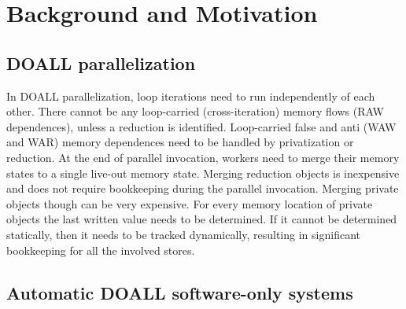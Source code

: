 \section{Background and Motivation}
\label{sec:motivation}

\subsection{DOALL parallelization}

In DOALL parallelization, loop iterations need to run independently of each
other.  There cannot be any loop-carried (cross-iteration) memory flows (RAW
dependences), unless a reduction is identified. Loop-carried false and anti (WAW
and WAR) memory dependences need to be handled by privatization or reduction.
At the end of parallel invocation, workers need to merge their memory states to
a single live-out memory state.  Merging reduction objects is inexpensive and
does not require bookkeeping during the parallel invocation.  Merging private
objects though can be very expensive. For every memory location of private
objects the last written value needs to be determined. If it cannot be
determined statically, then it needs to be tracked dynamically, resulting in
significant bookkeeping for all the involved stores.

\subsection{Automatic DOALL software-only systems}

